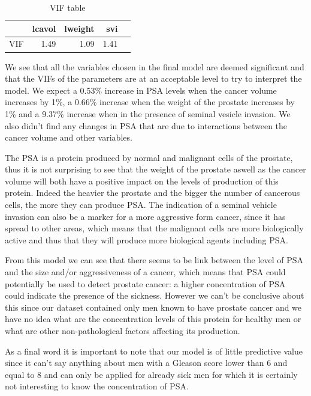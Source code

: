 \documentclass[10pt]{article}
\begin{document}
\begin{table}[ht]
\centering
\caption{VIF table} \label{summary}
\begin{tabular}{rrrrr}
  \hline
 & lcavol & lweight & svi \\ 
  \hline
VIF & 1.49 & 1.09 & 1.41 \\ 
   \hline
\end{tabular}
\end{table}

We see that all the variables chosen in the final model are deemed significant and that the VIFs of the parameters are at an acceptable level to try to interpret the model. 
We expect a 0.53\% increase in PSA levels when the cancer volume increases by 1\%, a 0.66\% increase when the weight of the prostate increases by 1\% and a 9.37\%  increase when in the presence of seminal vesicle invasion. We also didn't find any changes in PSA that are due to interactions between the cancer volume and other variables.

The PSA is a protein produced by normal and malignant cells of the prostate, thus it is not surprising to see that the weight of the prostate aswell as the cancer volume will both have a positive impact on the levels of production of this protein. Indeed the heavier the prostate and the bigger the number of cancerous cells, the more they can produce PSA. The indication of a seminal vehicle invasion can also be a marker for a more aggressive form cancer, since it has spread to other areas, which means that the malignant cells are more biologically active and thus that they will produce more biological agents including PSA.

From this model we can see that there seems to be link between the level of PSA and the size and/or aggressiveness of a cancer, which means that PSA could potentially be used to detect prostate cancer: a higher concentration of PSA could indicate the presence of the sickness. However we can't be conclusive about this since our dataset contained only men known to have prostate cancer and we have no idea what are the concentration levels of this protein for healthy men or what are other non-pathological factors affecting its production.

As a final word it is important to note that our model is of little predictive value since it can't say anything about men with a Gleason score lower than 6 and equal to 8 and can only be applied for already sick men for which it is certainly not interesting to know the concentration of PSA.
\end{document}
